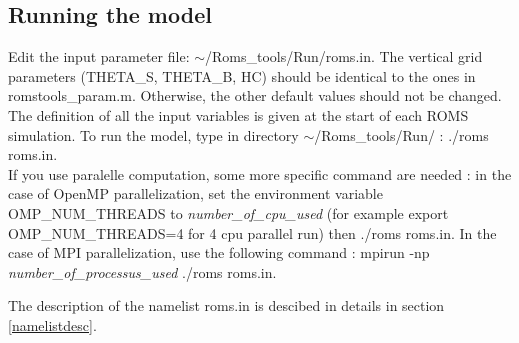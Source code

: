 \subsection{Running the model}
Edit the input parameter file: $\sim$/Roms\_tools/Run/roms.in.  The vertical grid
parameters (THETA\_S, THETA\_B, HC) should be identical to the ones in
romstools\_param.m.  Otherwise, the other default values should not be changed.  The
definition of all the input variables is given at the start of each ROMS simulation.
To run the model, type in directory $\sim$/Roms\_tools/Run/ : ./roms roms.in. \\
\noindent If you use paralelle computation, some more specific command are needed :
in the case of OpenMP parallelization, set the environment variable OMP\_NUM\_THREADS
to \textit{number\_of\_cpu\_used} (for example export OMP\_NUM\_THREADS=4 for 4 cpu
parallel run) then ./roms roms.in. In the case of MPI parallelization, use the
following command : mpirun -np \textit{number\_of\_processus\_used} ./roms roms.in.


\noindent The description of the namelist roms.in is descibed in details in section
\ref{namelistdesc}. \\

